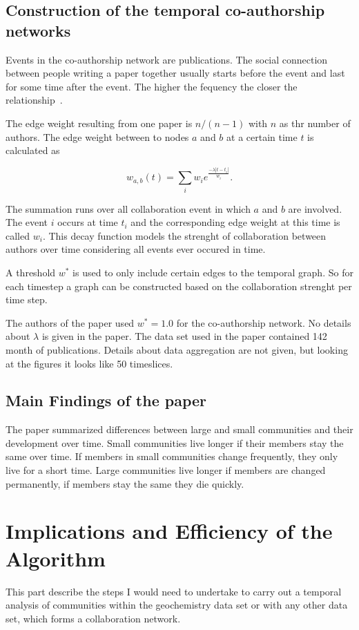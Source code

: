 \documentclass[runningheads,a4paper]{llncs}
\begin{document}
\subsection{Construction of the temporal co-authorship networks}
\label{evolution-constr}
Events in the co-authorship network are publications.
The social connection between people writing a paper together usually starts before the event and last for some time after the event. The higher the fequency the closer the relationship~\cite{ramasco2006social}.

The edge weight resulting from one paper is $n/(n-1)$ with $n$ as thr number of authors. The edge weight between to nodes $a$ and $b$ at a certain time $t$ is calculated as

$$w_{a,b}(t)= \sum_{i}^{} w_i e^{\frac{-\lambda \left|t-t_i\right|}{w_i}}.$$

The summation runs over all collaboration event in which $a$ and $b$ are involved. The event $i$ occurs at time $t_i$ and the corresponding edge weight at this time is called $w_i$. This decay function models the strenght of collaboration between authors over time considering all events ever occured in time.

A threshold $w^*$ is used to only include certain edges to the temporal graph. So for each timestep a graph can be constructed based on the collaboration strenght per time step.

The authors of the paper used $w^*=1.0$ for the co-authorship network.
No details about $\lambda$ is given in the paper.
The data set used in the paper contained 142 month of publications. Details about data aggregation are not given, but looking at the figures it looks like 50 timeslices.

\subsection{Main Findings of the paper}
\label{evolution-findings}
The paper summarized differences between large and small communities and their development over time. Small communities live longer if their members stay the same over time. If members in small communities change frequently, they only live for a short time. Large communities live longer if members are changed permanently, if members stay the same they die quickly.

\section{Implications and Efficiency of the Algorithm}
This part describe the steps I would need to undertake to carry out a temporal analysis of communities within the geochemistry data set or with any other data set, which forms a collaboration network.
\end{document}
